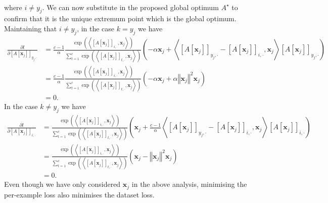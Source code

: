 \begin{tproof}
\begin{align*}
    \end{align*}
    where $i\neq y_j$. We can now substitute in the proposed global optimum $A^{\star}$ to confirm that it is the unique extremum point which is the global optimum. Maintaining that $i\neq y_j$, in the case $k=y_j$ we have
    \begin{align*}
        \frac{\partial l}{\partial\left[A\left[\mathbf{x}_j\right]\right]_{y_j,\cdot}}&=\frac{c-1}{\alpha}\frac{\exp\left(\left\langle\left[A\left[\mathbf{x}_j\right]\right]_{i,\cdot},\mathbf{x}_j\right\rangle\right)}{\sum_{t=1}^c\exp\left(\left\langle\left[A\left[\mathbf{x}_j\right]\right]_{t,\cdot},\mathbf{x}_j\right\rangle\right)}\left(-\alpha\mathbf{x}_j+\left\langle\left[A\left[\mathbf{x}_j\right]\right]_{y_j,\cdot}-\left[A\left[\mathbf{x}_j\right]\right]_{i,\cdot},\mathbf{x}_j\right\rangle\left[A\left[\mathbf{x}_j\right]\right]_{y_j,\cdot}\right)\\&=\frac{c-1}{\alpha}\frac{\exp\left(\left\langle\left[A\left[\mathbf{x}_j\right]\right]_{i,\cdot},\mathbf{x}_j\right\rangle\right)}{\sum_{t=1}^c\exp\left(\left\langle\left[A\left[\mathbf{x}_j\right]\right]_{t,\cdot},\mathbf{x}_j\right\rangle\right)}\left(-\alpha\mathbf{x}_j+\alpha\left\Vert\mathbf{x}_j\right\Vert^2\mathbf{x}_j\right)\\&=0.
    \end{align*}
    In the case $k\neq y_j$ we have
    \begin{align*}
        \frac{\partial l}{\partial\left[A\left[\mathbf{x}_j\right]\right]_{i,\cdot}}&=\frac{\exp\left(\left\langle\left[A\left[\mathbf{x}_j\right]\right]_{i,\cdot},\mathbf{x}_j\right\rangle\right)}{\sum_{t=1}^c\exp\left(\left\langle\left[A\left[\mathbf{x}_j\right]\right]_{t,\cdot},\mathbf{x}_j\right\rangle\right)}\left(\mathbf{x}_j+\frac{c-1}{\alpha}\left\langle\left[A\left[\mathbf{x}_j\right]\right]_{y_j,\cdot}-\left[A\left[\mathbf{x}_j\right]\right]_{i,\cdot},\mathbf{x}_j\right\rangle\left[A\left[\mathbf{x}_j\right]\right]_{i,\cdot}\right)\\&=\frac{\exp\left(\left\langle\left[A\left[\mathbf{x}_j\right]\right]_{i,\cdot},\mathbf{x}_j\right\rangle\right)}{\sum_{t=1}^c\exp\left(\left\langle\left[A\left[\mathbf{x}_j\right]\right]_{t,\cdot},\mathbf{x}_j\right\rangle\right)}\left(\mathbf{x}_j-\left\Vert\mathbf{x}_j\right\Vert^2\mathbf{x}_j\right)\\&=0.
    \end{align*}
    Even though we have only considered $\mathbf{x}_j$ in the above analysis, minimising the per-example loss also minimises the dataset loss.
\end{tproof}

